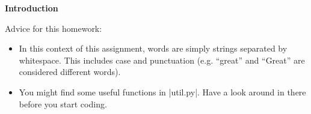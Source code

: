 {\bf Introduction}

Advice for this homework:
\begin{itemize}
  \item In this context of this assignment, words are simply strings separated
  by whitespace. This includes case and punctuation (e.g. ``great'' and
  ``Great'' are considered different words).
  \item You might find some useful functions in |util.py|.  Have a look
  around in there before you start coding.
\end{itemize}
